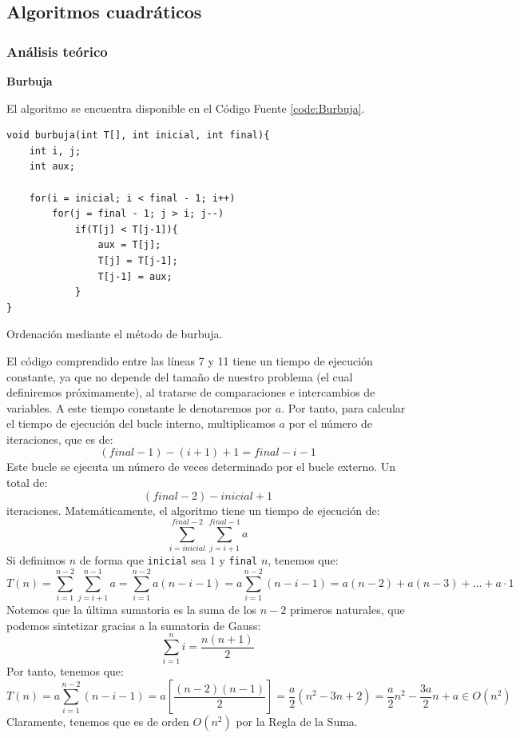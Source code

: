 \documentclass[12pt]{article}
\begin{document}
    \subsection{Algoritmos cuadráticos}
    \subsubsection{Análisis teórico}
    \textbf{Burbuja}
    
    El algoritmo se encuentra disponible en el Código Fuente \ref{code:Burbuja}.
    \begin{listing}
        \begin{verbatim}
void burbuja(int T[], int inicial, int final){
    int i, j;
    int aux;

    for(i = inicial; i < final - 1; i++)
        for(j = final - 1; j > i; j--)
            if(T[j] < T[j-1]){
                aux = T[j];
                T[j] = T[j-1];
                T[j-1] = aux;
            }
}
    \end{verbatim}
    \caption{Ordenación mediante el método de burbuja.}
    \label{code:Burbuja}
    \end{listing}

    El código comprendido entre las líneas 7 y 11 tiene un tiempo de ejecución constante, ya que no depende del tamaño de nuestro problema (el cual definiremos próximamente), al tratarse de comparaciones e intercambios de variables. A este tiempo constante le denotaremos por $a$. Por tanto, para calcular el tiempo de ejecución del bucle interno, multiplicamos $a$ por el número de iteraciones, que es de:
    $$(final - 1) - (i+1)+1 = final -i-1$$
    Este bucle se ejecuta un número de veces determinado por el bucle externo. Un total de:
    $$(final -2)-inicial+1$$
    iteraciones. Matemáticamente, el algoritmo tiene un tiempo de ejecución de:
    $$\sum_{i=inicial}^{final-2} \sum_{j=i+1}^{final-1} a$$
    Si definimos $n$ de forma que \verb|inicial| sea $1$ y \verb|final| $n$, tenemos que:
    $$T(n)=\sum_{i=1}^{n-2} \sum_{j=i+1}^{n-1} a = \sum_{i=1}^{n-2} a(n-i-1) = a\sum_{i=1}^{n-2} (n-i-1) = a(n-2) + a(n-3) + \ldots + a \cdot 1$$
    Notemos que la última sumatoria es la suma de los $n-2$ primeros naturales, que podemos sintetizar gracias a la sumatoria de Gauss:
    $$\sum_{i=1}^n i = \dfrac{n(n+1)}{2}$$
    Por tanto, tenemos que:
    $$T(n) = a\sum_{i=1}^{n-2} (n-i-1) = a\left[\dfrac{(n-2)(n-1)}{2}\right] = \dfrac{a}{2}(n^2-3n+2) = \dfrac{a}{2}n^2 - \dfrac{3a}{2}n+a\in O(n^2)$$
    Claramente, tenemos que es de orden $O(n^2)$ por la Regla de la Suma.\\
\end{document}
